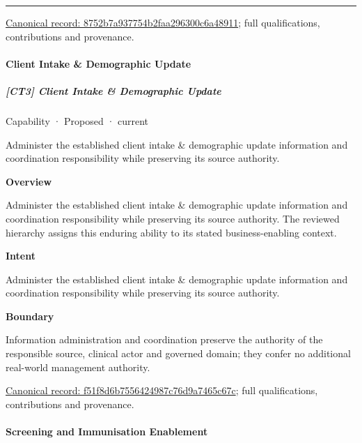\medskip\hrule\medskip

{\footnotesize \href{../../../../continuum/strategy/capability/8752b7a937754b2faa296300c6a48911.md}{Canonical record: 8752b7a937754b2faa296300c6a48911}; full qualifications, contributions and provenance.}\par
\paragraph{Client Intake \& Demographic Update}

\subparagraph{[CT3] Client Intake \& Demographic Update}

\label{element:f51f8d6b7556424987c76d9a7465c67c}
{\small Capability · Proposed · current}\par

Administer the established client intake \& demographic update information and coordination responsibility while preserving its source authority.



\textbf{Overview}



Administer the established client intake \& demographic update information and coordination responsibility while preserving its source authority. The reviewed hierarchy assigns this enduring ability to its stated business-enabling context.



\textbf{Intent}



Administer the established client intake \& demographic update information and coordination responsibility while preserving its source authority.



\textbf{Boundary}



Information administration and coordination preserve the authority of the responsible source, clinical actor and governed domain; they confer no additional real-world management authority.


{\footnotesize \href{../../../../continuum/strategy/capability/f51f8d6b7556424987c76d9a7465c67c.md}{Canonical record: f51f8d6b7556424987c76d9a7465c67c}; full qualifications, contributions and provenance.}\par
\paragraph{Screening and Immunisation Enablement}


